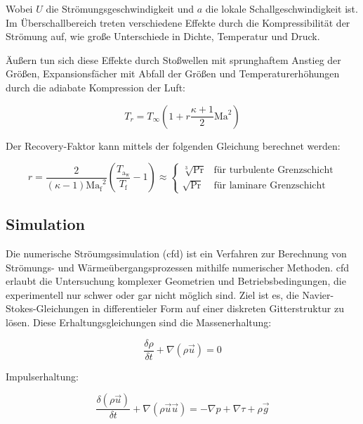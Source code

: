 Wobei $U$ die Strömungsgeschwindigkeit und $a$ die lokale Schallgeschwindigkeit ist. Im Überschallbereich treten verschiedene
Effekte durch die Kompressibilität der Strömung auf, wie große Unterschiede in Dichte, Temperatur und Druck.

Äußern tun sich diese Effekte durch Stoßwellen mit sprunghaftem Anstieg der Größen, Expansionsfächer mit Abfall der Größen und
Temperaturerhöhungen durch die adiabate Kompression der Luft:

\begin{equation}
  \label{eq:recovery_temperatur}
  T_r = T_{\infty} \left( 1 + r \frac{\kappa + 1}{2} \text{Ma}^2 \right)
\end{equation}

Der Recovery-Faktor kann mittels der folgenden Gleichung berechnet werden:

\begin{equation}
  \label{eq:recovery_faktor}
  r = \frac{2}{\left( \kappa - 1 \right) \mathrm{Ma_f}^2} \left( \frac{T_\mathrm{a_{w}}}{T_\mathrm{f}} - 1 \right) \approx
  \begin{cases}
    \sqrt[3]{\text{Pr}} & \text{für turbulente Grenzschicht}\\
    \sqrt{\text{Pr}} & \text{für laminare Grenzschicht}
  \end{cases}
\end{equation}

\subsection{Simulation}

Die numerische Ströumgssimulation (\ac{cfd}) ist ein Verfahren zur Berechnung von Strömungs- und Wärmeübergangsprozessen
mithilfe numerischer Methoden. \ac{cfd} erlaubt die Untersuchung komplexer Geometrien und Betriebsbedingungen,
die experimentell nur schwer oder gar nicht möglich sind. Ziel ist es, die Navier-Stokes-Gleichungen in differentieler Form auf einer
diskreten Gitterstruktur zu lösen. Diese Erhaltungsgleichungen sind die Massenerhaltung:

\begin{equation}
  \label{eq:navier_massenerhaltung}
  \frac{\delta \rho}{\delta t} + \nabla \left( \rho \vec{u} \right) = 0
\end{equation}

Impulserhaltung:

\begin{equation}
  \label{eq:navier_impulserhaltung}
  \frac{\delta \left( \rho \vec{u} \right)}{\delta t} + \nabla \left( \rho \vec{u} \vec{u} \right) = -\nabla p + \nabla \tau + \rho \vec{g}
\end{equation}

